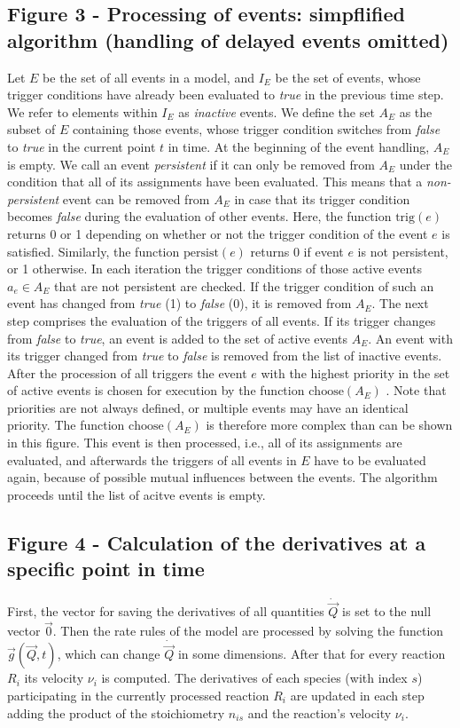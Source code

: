 \documentclass[10pt]{bmc_article}
\newenvironment{bmcformat}{\baselineskip20pt\sloppy\setboolean{publ}{false}}{\baselineskip20pt\sloppy}
\newcommand{\true}{\emph{true}}
\newcommand{\false}{\emph{false}}
\begin{document}
\begin{bmcformat}
\subsection*{Figure 3 - Processing of events: simpflified algorithm (handling of delayed events omitted)}
Let $E$ be the set of all events in a model, and $I_E$ be the set of events, whose trigger
conditions have already been evaluated to \true{} in the previous time step. We refer to elements within
$I_E$ as \emph{inactive} events. We define the set $A_E$ as the subset of $E$ containing those events,
whose trigger condition switches from \false{} to \true{} in the current point $t$ in time. At the beginning
of the event handling, $A_E$ is empty. We call an event \emph{persistent} if it can only be removed from
$A_E$ under the condition that all of its assignments have been evaluated. This means that a
\emph{non-persistent} event can be removed from $A_E$ in case that its trigger condition becomes \false{}
during the evaluation of other events. Here, the function $\mathrm{trig}(e)$ returns 0 or 1 depending 
on whether or not the trigger condition of the event $e$ is satisfied. Similarly, the function
$\mathrm{persist}(e)$ returns 0 if event $e$ is not persistent, or 1 otherwise.
In each iteration the trigger conditions of those active events $a_e \in A_E$ that are not persistent are checked.
If the trigger condition of such an event has changed from \true{} (1) to \false{} (0), it is removed from $A_E$.
The next step comprises the evaluation of the triggers of all events.
If its trigger changes from \false{} to \true{}, an event is added to the set of active events $A_E$.
An event with its trigger changed from \true{} to \false{} is removed from the list of inactive events.
After the procession of all triggers the event $e$ with the highest priority in the set of active events is chosen for execution by the function $\mathrm{choose}(A_E)$ .
Note that priorities are not always defined, or multiple events may have an identical priority. The function $\mathrm{choose}(A_E)$ is therefore more complex than can be shown in this figure.
This event is then processed, i.e., all of its assignments are evaluated, and afterwards the triggers of all events in $E$ have to be evaluated again, because of possible mutual influences between the events.
The algorithm proceeds until the list of acitve events is empty.

\subsection*{Figure 4 - Calculation of the derivatives at a specific point in time}
First, the vector for saving the derivatives of all quantities $\dot{\vec{Q}}$ is set to the null vector $\vec{0}$.
Then the rate rules of the model are processed by solving the function $\vec{g}(\vec{Q}, t)$, which can change $\dot{\vec{Q}}$ in some dimensions.
After that for every reaction $R_i$ its velocity $\nu_i$ is computed.
The derivatives of each species (with index $s$) participating in the currently processed reaction $R_i$ are updated
in each step adding the product of the stoichiometry $n_{is}$ and the reaction's velocity $\nu_i$.


\end{bmcformat}
\end{document}
